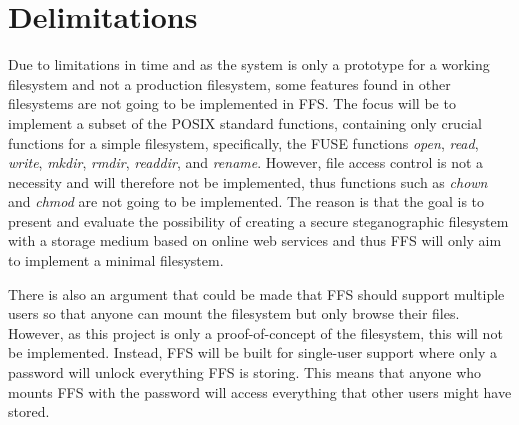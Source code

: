 \section{Delimitations} %

Due to limitations in time and as the system is only a prototype for a working filesystem and not a production filesystem, some features found in other filesystems are not going to be implemented in FFS. The focus will be to implement a subset of the POSIX standard functions, containing only crucial functions for a simple filesystem, specifically, the FUSE functions \textit{open}, \textit{read}, \textit{write}, \textit{mkdir}, \textit{rmdir}, \textit{readdir}, and \textit{rename}. However, file access control is not a necessity and will therefore not be implemented, thus functions such as \textit{chown} and \textit{chmod} are not going to be implemented. The reason is that the goal is to present and evaluate the possibility of creating a secure steganographic filesystem with a storage medium based on online web services and thus FFS will only aim to implement a minimal filesystem. 

There is also an argument that could be made that FFS should support multiple users so that anyone can mount the filesystem but only browse their files. However, as this project is only a proof-of-concept of the filesystem, this will not be implemented. Instead, FFS will be built for single-user support where only a password will unlock everything FFS is storing. This means that anyone who mounts FFS with the password will access everything that other users might have stored.

